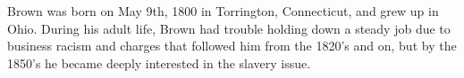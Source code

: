 \documentclass[a4paper]{article}
\begin{document}
Brown was born on May 9th, 1800 in Torrington, Connecticut, and grew up in Ohio. During his adult life, Brown had trouble holding down a steady job due to business racism and charges that followed him from the 1820's and on, but by the 1850's he became deeply interested in the slavery issue.
%
%
%
%
%
%
%
\end{document}
